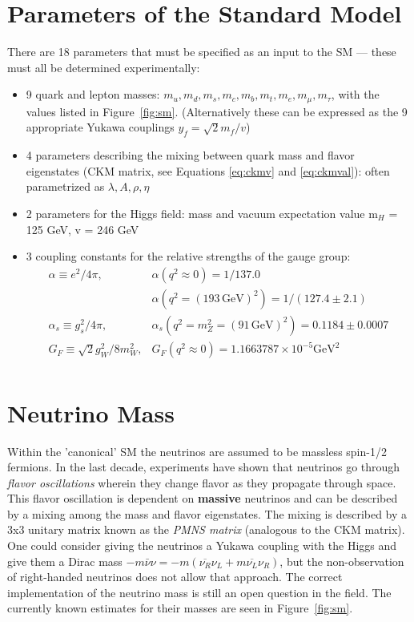 \section{Parameters of the Standard Model}

There are 18 parameters that must be specified as an input to the SM --- these must all be determined experimentally:

\begin{itemize}
\item 9 quark and lepton masses: $m_{u}, m_{d}, m_{s}, m_{c}, m_{b}, m_{t}, m_{e}, m_{\mu}, m_{\tau}$, with the values listed in Figure~\ref{fig:sm}. (Alternatively these can be expressed as the 9 appropriate Yukawa couplings $y_{f}=\sqrt{2}m_{f} / v$)
\item 4 parameters describing the mixing between quark mass and flavor eigenstates (CKM matrix, see Equations \ref{eq:ckmv} and \ref{eq:ckmval}): often parametrized as $\lambda, A, \rho, \eta$
\item 2 parameters for the Higgs field: mass and vacuum expectation value m$_{H}$ = 125 GeV, v = 246 GeV 
\item 3 coupling constants for the relative strengths of the gauge group:
\begin{equation*}
\begin{array}{ll}
\alpha \equiv e^{2} / 4 \pi, & \alpha(q^{2} \approx 0) = 1 / 137.0 \\
 & \alpha(q^{2} = (193\,\mathrm{GeV})^{2}) = 1 / (127.4\pm 2.1)\\
\alpha_{s} \equiv g_{s}^{2} / 4 \pi,  & \alpha_{s}(q^{2}=m_{Z}^{2} = (91\,\mathrm{GeV})^{2})= 0.1184 \pm 0.0007\\
G_{F} \equiv \sqrt{2} g^{2}_{W} / 8 m_{W}^{2}, & G_{F} (q^{2}\approx0) = 1.1663787\times10^{-5} \textrm{GeV}^{2}\\

\end{array}
\end{equation*}
\end{itemize}

\section{Neutrino Mass}

Within the 'canonical' SM the neutrinos are assumed to be massless spin-1/2 fermions. In the last decade, experiments have shown that neutrinos go through \textit{flavor oscillations} wherein they change flavor as they propagate through space. This flavor oscillation is dependent on \textbf{massive} neutrinos and can be described by a mixing among the mass and flavor eigenstates. The mixing is described by a 3x3 unitary matrix known as the \textit{PMNS matrix} (analogous to the CKM matrix). One could consider giving the neutrinos a Yukawa coupling with the Higgs and give them a Dirac mass $-m\bar{\nu}\nu = -m(\overline{\nu_{R}}\nu_{L} + m\overline{\nu_{L}}\nu_{R})$, but the non-observation of right-handed neutrinos does not allow that approach. The correct implementation of the neutrino mass is still an open question in the field. The currently known estimates for their masses are seen in Figure~\ref{fig:sm}.

